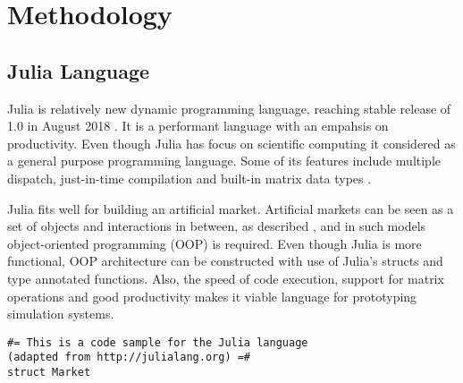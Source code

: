 
\section{Methodology}

\subsection{Julia Language}
Julia is relatively new dynamic programming language, 
reaching stable release of 1.0 in August 2018 \citep{JuliaV1}.
It is a performant language with an empahsis
on productivity. Even though Julia has focus on scientific 
computing it considered as a general purpose programming
language. Some of its features include
multiple dispatch, just-in-time compilation and built-in
matrix data types \citep{Julia}.

Julia fits well for building an artificial market.
Artificial markets can be seen as a set of objects
and interactions in between, as described \citet{Ben12},
and in such models object-oriented programming (OOP)
is required. Even though Julia is more functional, OOP
architecture can be constructed with use of Julia's 
structs and type annotated functions. Also, the 
speed of code execution, support for matrix operations 
and good productivity makes it viable language for 
prototyping simulation systems. 


\begin{lstlisting}
#= This is a code sample for the Julia language
(adapted from http://julialang.org) =#
struct Market
    
\end{lstlisting}